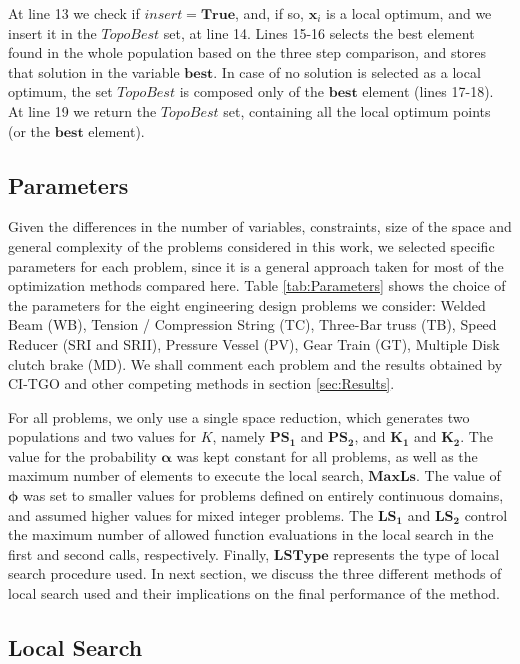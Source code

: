 At line 13 we check if $insert = \bm{True}$, and, if so, $\bm{x}_i$ is a local optimum, and we insert it in the $TopoBest$ set, at line 14. Lines 15-16 selects the best element found in the whole population based on the three step comparison, and stores that solution in the variable $\bm{best}$. In case of no solution is selected as a local optimum, the set $TopoBest$ is composed only of the $\bm{best}$ element (lines 17-18). At line 19 we return the $TopoBest$ set, containing all the local optimum points (or the $\bm{best}$ element).



\subsection{Parameters}

Given the differences in the number of variables, constraints, size of the space and general complexity of the problems considered in this work, we selected specific parameters for each problem, since it is a general approach taken for most of the optimization methods compared here. Table \ref{tab:Parameters} shows the choice of the parameters for the eight engineering design problems we consider: Welded Beam (WB), Tension / Compression String (TC), Three-Bar truss (TB), Speed Reducer (SRI and SRII), Pressure Vessel (PV), Gear Train (GT), Multiple Disk clutch brake (MD). We shall comment each problem and the results obtained by CI-TGO and other competing methods in section \ref{sec:Results}.



For all problems, we only use a single space reduction, which generates two populations and two values for $K$, namely $\bm{PS_1}$ and $\bm{PS_2}$, and $\bm{K_1}$ and $\bm{K_2}$. The value for the probability $\bm{\alpha}$ was kept constant for all problems, as well as the maximum number of elements to execute the local search, $\bm{MaxLs}$. The value of $\bm{\phi}$ was set to smaller values for problems defined on entirely continuous domains, and assumed higher values for mixed integer problems. The $\bm{LS_1}$ and $\bm{LS_2}$ control the maximum number of allowed function evaluations in the local search in the first and second calls, respectively. Finally, $\bm{LSType}$ represents the type of local search procedure used. In next section, we discuss the three different methods of local search used and their implications on the final performance of the method.

\subsection{Local Search}


